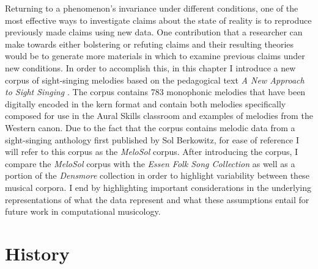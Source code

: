 \documentclass[12pt,]{book}
\begin{document}
Returning to a phenomenon's invariance under different conditions, one of the most effective ways to investigate claims about the state of reality is to reproduce previously made claims using new data.
One contribution that a researcher can make towards either bolstering or refuting claims and their resulting theories would be to generate more materials in which to examine previous claims under new conditions.
In order to accomplish this, in this chapter I introduce a new corpus of sight-singing melodies based on the pedagogical text \emph{A New Approach to Sight Singing} \citep{berkowitzNewApproachSight2011}.
The corpus contains 783 monophonic melodies that have been digitally encoded in the kern format \citep{huronHumdrumToolkitReference1994} and contain both melodies specifically composed for use in the Aural Skills classroom and examples of melodies from the Western canon.
Due to the fact that the corpus contains melodic data from a sight-singing anthology first published by Sol Berkowitz, for ease of reference I will refer to this corpus as the \emph{MeloSol} corpus.
After introducing the corpus, I compare the \emph{MeloSol} corpus with the \emph{Essen Folk Song Collection} \citep{schaffrathEssenFolkSong1995} as well as a portion of the \emph{Densmore} collection \citep{shanahanDensmoreCollectionNative2014} in order to highlight variability between these musical corpora.
I end by highlighting important considerations in the underlying representations of what the data represent and what these assumptions entail for future work in computational musicology.

\hypertarget{history}{%
\section{History}\label{history}}
\end{document}
